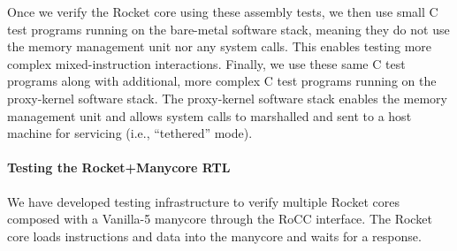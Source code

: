 Once we verify the Rocket core using these assembly tests, we then use
small C test programs running on the bare-metal software stack, meaning
they do not use the memory management unit nor any system calls. This
enables testing more complex mixed-instruction interactions. Finally, we
use these same C test programs along with additional, more complex C test
programs running on the proxy-kernel software stack. The proxy-kernel
software stack enables the memory management unit and allows system calls
to marshalled and sent to a host machine for servicing (i.e.,
``tethered'' mode).

\paragraph{Testing the Rocket+Manycore RTL}
We have developed testing infrastructure to verify multiple Rocket cores
composed with a Vanilla-5 manycore through the RoCC interface. The Rocket
core loads instructions and data into the manycore and waits for a
response.

